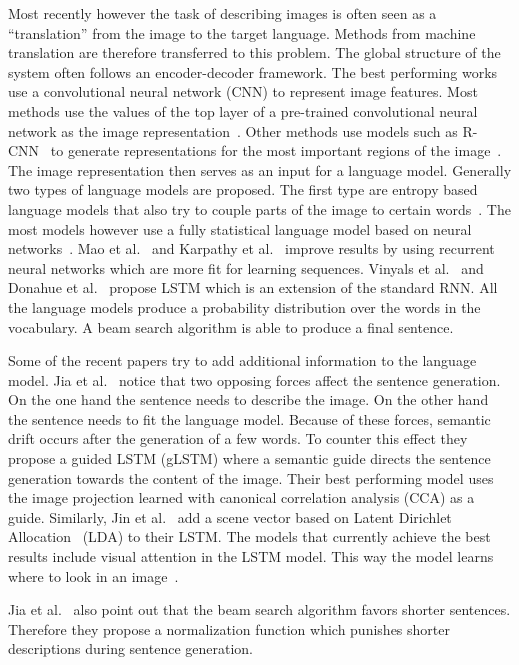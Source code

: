 \documentclass[twoside,twocolumn]{article}
\begin{document}
	Most recently however the task of describing images is often seen as a  ``translation'' from the image to the target language.
	Methods from machine translation are therefore transferred to this problem. The global structure of the system often follows an encoder-decoder framework.
	The best performing works use a convolutional neural network (CNN) to represent image features. Most methods use the values of the top layer of a pre-trained convolutional neural network as the image representation~\cite{Donahue2015,Mao2014a,Karpathy2015,Google}. Other methods use models such as R-CNN~\cite{Girshick2014} to generate representations for the most important regions of the image~\cite{Jin2015,Mitchell2015}.
	The image representation then serves as an input for a language model.
	Generally two types of language models are proposed. The first type are entropy based language models that also try to couple parts of the image to certain words~\cite{Lebret2015,Mitchell2015}. The most models however use a fully statistical language model based on neural networks~\cite{Kiros2013}. Mao et al.~\cite{Mao2014a} and Karpathy et al.~\cite{Karpathy2015} improve results by using recurrent neural networks which are more fit for learning sequences. Vinyals et al.~\cite{Google} and Donahue et al.~\cite{Donahue2015} propose LSTM which is an extension of the standard RNN.
	All the language models produce a probability distribution over the words in the vocabulary. A beam search algorithm is able to produce a final sentence.
	
	Some of the recent papers try to add additional information to the language model. Jia et al.~\cite{Fernando2015} notice that two opposing forces affect the sentence generation. On the one hand the sentence needs to describe the image. On the other hand the sentence needs to fit the language model. Because of these forces, semantic drift occurs after the generation of a few words. To counter this effect they propose a guided LSTM (gLSTM) where a semantic guide directs the sentence generation towards the content of the image. Their best performing model uses the image projection learned with canonical correlation analysis (CCA) as a guide. 
	Similarly, Jin et al.~\cite{Jin2015} add a scene vector based on Latent Dirichlet Allocation~\cite{Blei2012} (LDA) to their LSTM.
	The models that currently achieve the best results include visual attention in the LSTM model. This way the model learns where to look in an image~\cite{Jin2015,Xu2015}.
	
	Jia et al.~\cite{Fernando2015} also point out that the beam search algorithm favors shorter sentences. Therefore they propose a normalization function which punishes shorter descriptions during sentence generation.
	
\end{document}
